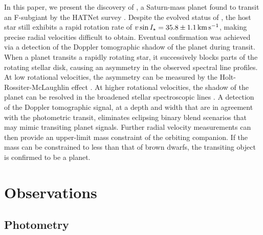 \documentclass[apjl]{emulateapj}
\newcommand{\kms}{\ensuremath{\rm km\,s^{-1}}}
\newcommand{\vsini}{\ensuremath{v \sin{I_\star}}}
\newcommand{\genevastarvsini}{\ensuremath{35.8\pm1.1}}             %
\begin{document}
In this paper, we present the discovery of \hatcurb{}, a Saturn-mass planet found to transit an F-subgiant by the HATNet survey \citep{Bakos:2004}. Despite the evolved status of \hatcur{}, the host star still exhibits a rapid rotation rate of $\vsini = \genevastarvsini\,\kms$, making precise radial velocities difficult to obtain. Eventual confirmation was achieved via a detection of the Doppler tomographic shadow of the planet during transit. When a planet transits a rapidly rotating star, it successively blocks parts of the rotating stellar disk, causing an asymmetry in the observed spectral line profiles. At low rotational velocities, the asymmetry can be measured by the Holt-Rossiter-McLaughlin effect \citep{1893AstAp..12..646H,Rossiter:1924,McLaughlin:1924}. At higher rotational velocities, the shadow of the planet can be resolved in the broadened stellar spectroscopic lines \citep[e.g.][]{Collier:2010a,Collier:2010b}. A detection of the Doppler tomographic signal, at a depth and width that are in agreement with the photometric transit, eliminates eclipsing binary blend scenarios that may mimic transiting planet signals. Further radial velocity measurements can then provide an upper-limit mass constraint of the orbiting companion. If the mass can be constrained to less than that of brown dwarfs, the transiting object is confirmed to be a planet.






\section{Observations}
\label{sec:obs}


\subsection{Photometry}
\label{sec:detection}
\begin{comment}
\end{comment}
\end{document}
